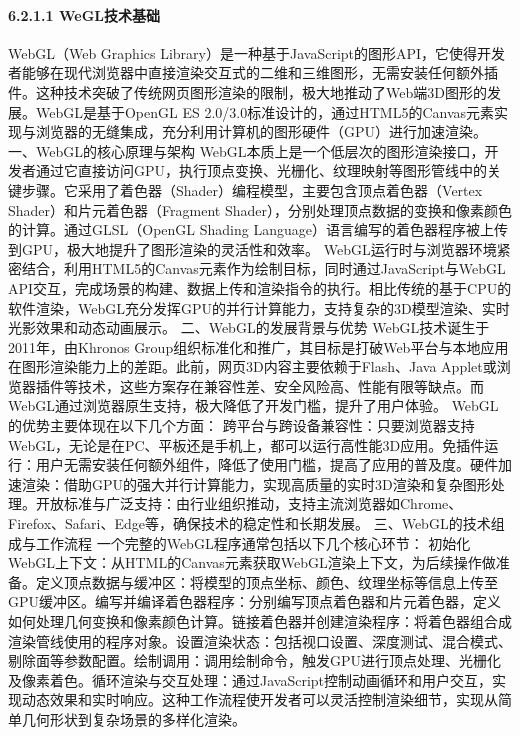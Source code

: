 {\paragraph{6.2.1.1 WeGL技术基础}\label{weglux6280ux672fux57faux7840} WebGL（Web Graphics
Library）是一种基于JavaScript的图形API，它使得开发者能够在现代浏览器中直接渲染交互式的二维和三维图形，无需安装任何额外插件。这种技术突破了传统网页图形渲染的限制，极大地推动了Web端3D图形的发展。WebGL是基于OpenGL
ES 2.0/3.0标准设计的，通过HTML5的Canvas元素实现与浏览器的无缝集成，充分利用计算机的图形硬件（GPU）进行加速渲染。 一、WebGL的核心原理与架构
WebGL本质上是一个低层次的图形渲染接口，开发者通过它直接访问GPU，执行顶点变换、光栅化、纹理映射等图形管线中的关键步骤。它采用了着色器（Shader）编程模型，主要包含顶点着色器（Vertex
Shader）和片元着色器（Fragment Shader），分别处理顶点数据的变换和像素颜色的计算。通过GLSL（OpenGL Shading Language）语言编写的着色器程序被上传到GPU，极大地提升了图形渲染的灵活性和效率。
WebGL运行时与浏览器环境紧密结合，利用HTML5的Canvas元素作为绘制目标，同时通过JavaScript与WebGL
API交互，完成场景的构建、数据上传和渲染指令的执行。相比传统的基于CPU的软件渲染，WebGL充分发挥GPU的并行计算能力，支持复杂的3D模型渲染、实时光影效果和动态动画展示。 二、WebGL的发展背景与优势
WebGL技术诞生于2011年，由Khronos Group组织标准化和推广，其目标是打破Web平台与本地应用在图形渲染能力上的差距。此前，网页3D内容主要依赖于Flash、Java
Applet或浏览器插件等技术，这些方案存在兼容性差、安全风险高、性能有限等缺点。而WebGL通过浏览器原生支持，极大降低了开发门槛，提升了用户体验。 WebGL的优势主要体现在以下几个方面：
跨平台与跨设备兼容性：只要浏览器支持WebGL，无论是在PC、平板还是手机上，都可以运行高性能3D应用。免插件运行：用户无需安装任何额外组件，降低了使用门槛，提高了应用的普及度。硬件加速渲染：借助GPU的强大并行计算能力，实现高质量的实时3D渲染和复杂图形处理。开放标准与广泛支持：由行业组织推动，支持主流浏览器如Chrome、Firefox、Safari、Edge等，确保技术的稳定性和长期发展。
三、WebGL的技术组成与工作流程 一个完整的WebGL程序通常包括以下几个核心环节：
初始化WebGL上下文：从HTML的Canvas元素获取WebGL渲染上下文，为后续操作做准备。定义顶点数据与缓冲区：将模型的顶点坐标、颜色、纹理坐标等信息上传至GPU缓冲区。编写并编译着色器程序：分别编写顶点着色器和片元着色器，定义如何处理几何变换和像素颜色计算。链接着色器并创建渲染程序：将着色器组合成渲染管线使用的程序对象。设置渲染状态：包括视口设置、深度测试、混合模式、剔除面等参数配置。绘制调用：调用绘制命令，触发GPU进行顶点处理、光栅化及像素着色。循环渲染与交互处理：通过JavaScript控制动画循环和用户交互，实现动态效果和实时响应。这种工作流程使开发者可以灵活控制渲染细节，实现从简单几何形状到复杂场景的多样化渲染。
}
